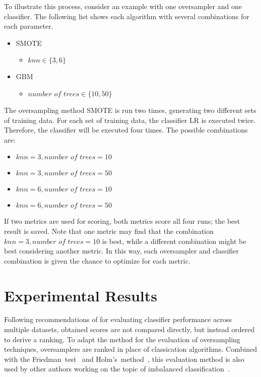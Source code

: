 \documentclass[sort&compress]{elsarticle}
\begin{document}
	To illustrate this process, consider an example with one oversampler and one classifier. The following list shows each algorithm with several combinations for each parameter.
	\begin{itemize}
		\item \ac{SMOTE}
		\begin{itemize}
			\item $knn \in \{3, 6\}$
		\end{itemize}
		\item \ac{GBM}
		\begin{itemize}
			\item $\textit{number of trees} \in \{10, 50\}$
		\end{itemize}
	\end{itemize}
	The oversampling method \ac{SMOTE} is run two times, generating two different sets of training data. For each set of training data, the classifier \ac{LR} is executed twice. Therefore, the classifier will be executed four times. The possible combinations are:
	\begin{itemize}
		\item $knn = 3, \textit{number of trees} = 10$
		\item $knn = 3, \textit{number of trees} = 50$
		\item $knn = 6, \textit{number of trees} = 10$
		\item $knn = 6, \textit{number of trees} = 50$
	\end{itemize}
	If two metrics are used for scoring, both metrics score all four runs; the best result is saved. Note that one metric may find that the combination $knn = 3, \textit{number of trees} = 10$ is best, while a different combination might be best considering another metric. In this way, each oversampler and classifier combination is given the chance to optimize for each metric.
    
\section{Experimental Results}
\label{sec:experimental-results}

Following recommendations of \citet{Demsar.2006} for evaluating classifier performance across multiple datasets, obtained scores are not compared directly, but instead ordered to derive a ranking. To adapt the method for the evaluation of oversampling techniques, oversamplers are ranked in place of classication algorithms. Combined with the Friedman~test~\citep{Friedman.1937} and Holm's~method~\citep{Holm.1979}, this evaluation method is also used by other authors working on the topic of imbalanced classification~\citep{Cieslak.2012,Rivera.2017,Galar.2016}.
\end{document}
